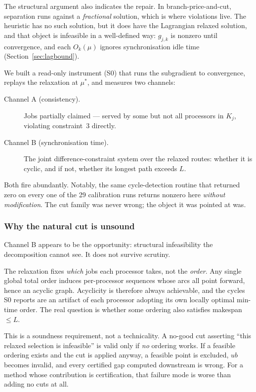 \documentclass[11pt,a4paper]{article}
\newcommand{\Kj}{\ensuremath{K_j}}
\begin{document}
The structural argument also indicates the repair. In branch-price-and-cut,
separation runs against a \emph{fractional} solution, which is where violations
live. The heuristic has no such solution, but it does have the Lagrangian relaxed
solution, and that object is infeasible in a well-defined way: $g_{j,k}$ is
nonzero until convergence, and each $O_k(\mu)$ ignores synchronisation idle time
(Section~\ref{sec:lagbound}).

We built a read-only instrument (S0) that runs the subgradient to convergence,
replays the relaxation at $\mu^\ast$, and measures two channels:

\begin{description}
  \item[Channel A (consistency).] Jobs partially claimed --- served by some but not
    all processors in $\Kj$, violating constraint~3 directly.
  \item[Channel B (synchronisation time).] The joint difference-constraint system
    over the relaxed routes: whether it is cyclic, and if not, whether its longest
    path exceeds $L$.
\end{description}

Both fire abundantly. Notably, the same cycle-detection routine that returned zero
on every one of the 29 calibration runs returns nonzero here \emph{without
modification}. The cut family was never wrong; the object it was pointed at was.



\subsubsection{Why the natural cut is unsound}\label{sec:s0b}

Channel B appears to be the opportunity: structural infeasibility the
decomposition cannot see. It does not survive scrutiny.

The relaxation fixes \emph{which} jobs each processor takes, not the \emph{order}.
Any single global total order induces per-processor sequences whose arcs all point
forward, hence an acyclic graph. Acyclicity is therefore always achievable, and
the cycles S0 reports are an artifact of each processor adopting its own locally
optimal min-time order. The real question is whether some ordering also satisfies
makespan $\le L$.

This is a soundness requirement, not a technicality. A no-good cut asserting
``this relaxed selection is infeasible'' is valid only if \emph{no} ordering works.
If a feasible ordering exists and the cut is applied anyway, a feasible point is
excluded, $ub$ becomes invalid, and every certified gap computed downstream is
wrong. For a method whose contribution is certification, that failure mode is
worse than adding no cuts at all.
\end{document}
